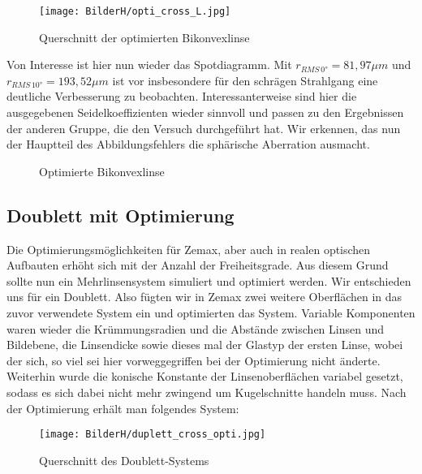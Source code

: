 \documentclass[twoside,colorback,accentcolor=tud4c,11pt]{tudreport}
\begin{document}
	\begin{figure}[H]
\centering
   	\begin{minipage}[b]{\textwidth}
   	\centering
   	\texttt{[image: BilderH/opti\_cross\_L.jpg]}
   	\caption{Querschnitt der optimierten Bikonvexlinse}
  	\end{minipage}
\end{figure}
	
	Von Interesse ist hier nun wieder das Spotdiagramm. Mit $r_{RMS \, 0°} = 81,97 \mu m $ und $r_{RMS \, 10°} = 193,52 \mu m $ ist vor insbesondere für den schrägen Strahlgang eine deutliche Verbesserung zu beobachten. Interessanterweise sind hier die ausgegebenen Seidelkoeffizienten wieder sinnvoll und passen zu den Ergebnissen der anderen Gruppe, die den Versuch durchgeführt hat. Wir erkennen, das nun der Hauptteil des Abbildungsfehlers die sphärische Aberration ausmacht. 
	
	\begin{figure}[H]
\centering
  \quad
  \quad   
  \caption{Optimierte Bikonvexlinse}
\end{figure}
	
	\subsection{Doublett mit Optimierung}
	
	Die Optimierungsmöglichkeiten für Zemax, aber auch in realen optischen Aufbauten erhöht sich mit der Anzahl der Freiheitsgrade. Aus diesem Grund sollte nun ein Mehrlinsensystem simuliert und optimiert werden. Wir entschieden uns für ein Doublett. Also fügten wir in Zemax zwei weitere Oberflächen in das zuvor verwendete System ein und optimierten das System. Variable Komponenten waren wieder die Krümmungsradien und die Abstände zwischen Linsen und Bildebene, die Linsendicke sowie dieses mal der Glastyp der ersten Linse, wobei der sich, so viel sei hier vorweggegriffen bei der Optimierung nicht änderte. Weiterhin wurde die konische Konstante der Linsenoberflächen variabel gesetzt, sodass es sich dabei nicht mehr zwingend um Kugelschnitte handeln muss. Nach der Optimierung erhält man folgendes System:
	
\begin{figure}[H]
\centering
   	\begin{minipage}[b]{\textwidth}
   	\centering
   	\texttt{[image: BilderH/duplett\_cross\_opti.jpg]}
   	\caption{Querschnitt des Doublett-Systems}
  	\end{minipage}
\end{figure}
	
\end{document}
